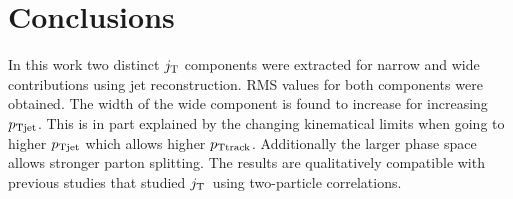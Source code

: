 %
%

\section{Conclusions}
\label{sec:conclusions}
In this work two distinct $j_{\rm T}$ components were extracted for narrow and wide contributions using jet reconstruction. RMS values for both components were obtained. The width of the wide component is found to increase for increasing $p_{\rm Tjet}$. This is in part explained by the changing kinematical limits when going to higher $p_{\rm Tjet}$ which allows higher $p_{\rm Ttrack}$. Additionally the larger phase space allows stronger parton splitting. The results are qualitatively compatible with previous studies that studied $j_{\rm T}$ using two-particle correlations.



